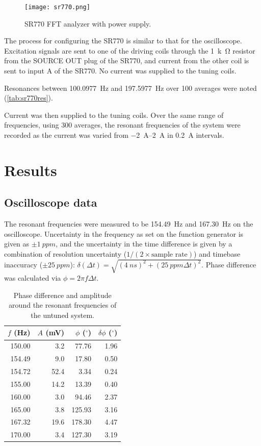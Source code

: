 \documentclass{article}
\begin{document}
\begin{figure}
  \centering
  \texttt{[image: sr770.png]}
  \caption{SR770 FFT analyzer with power supply.}
\end{figure}

The process for configuring the SR770 is similar to that for the oscilloscope. Excitation signals are sent to one of the driving coils through the \qty{1}{k\ohm} resistor from the SOURCE OUT plug of the SR770, and current from the other coil is sent to input A of the SR770. No current was supplied to the tuning coils.

Resonances between \qty{100.0977}{Hz} and \qty{197.5977}{Hz} over 100 averages were noted (\autoref{tab:sr770res}).

Current was then supplied to the tuning coils. Over the same range of frequencies, using 300 averages, the resonant frequencies of the system were recorded as the current was varied from \qtyrange{-2}{2}{\ampere} in \qty{0.2}{\ampere} intervals.

\section{Results}

\subsection{Oscilloscope data}
The resonant frequencies were measured to be \qty{154.49}{Hz} and \qty{167.30}{Hz} on the oscilloscope. Uncertainty in the frequency as set on the function generator is given as $\pm\qty{1}{ppm}$, and the uncertainty in the time difference is given by a combination of resolution uncertainty ($1/(2\times\text{sample rate})$) and timebase inaccuracy ($\pm\qty{25}{ppm}$):  $\delta(\Delta t) = \sqrt{\left( \qty{4}{ns} \right)^2 + \left( \qty{25}{ppm} \Delta t \right)^2}$.
Phase difference was calculated via $\phi = 2\pi f \Delta t$.

\begin{table}
  \centering
  \caption{Phase difference and amplitude around the resonant frequencies of the untuned system.}
  \begin{tabular}{@{}rrrr@{}}
    \toprule
    $f$ (\unit{Hz}) & $A$ (\unit{\mV}) & $\phi$ ($^\circ$) & $\delta\phi$ ($^\circ$) \\ \midrule
    150.00    & 3.2      &77.76 & 1.96    \\
    154.49   & 9.0      & 17.80 & 0.50   \\
    154.72   & 52.4     & 3.34 & 0.24   \\
    155.00    & 14.2     &13.39 & 0.40    \\
    160.00    & 3.0      &94.46 & 2.37    \\
    165.00    & 3.8      &125.93 & 3.16    \\
    167.32   & 19.6     & 178.30 & 4.47   \\
    170.00    & 3.4      &127.30 & 3.19    \\ \bottomrule
  \end{tabular}
  \label{tab:oscfa}
\end{table}
\end{document}
